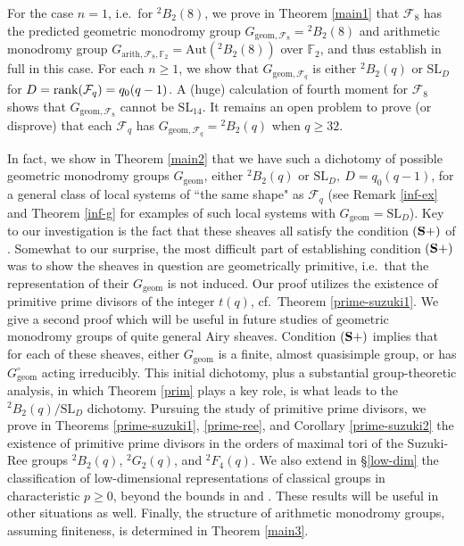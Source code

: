 \documentclass[11pt]{amsart}
\theoremstyle{plain}
\theoremstyle{definition}
\numberwithin{thm}{section}
\numberwithin{equation}{thm}
\newcommand{\rank}{{\rm rank}}
\newcommand{\Aut}{\mathrm{Aut}}
\newcommand{\SL}{\mathrm{SL}}
\newcommand{\sF}{{\mathcal F}}
\newcommand{\F}{{\mathbb F}}
\newcommand{\0}{\emptyset}
\newcommand{\ari}{{\mathrm {arith}}}
\newcommand{\geo}{{\mathrm {geom}}}
\newcommand{\CSP}{\mathrm {({\bf S+})}}
\newcommand{\tw}[1]{{}^#1\!}
\begin{document}
For the case $n=1$, i.e.\ for $\tw2 B_2(8)$, we prove in Theorem \ref{main1} that $\sF_8$ has the predicted geometric monodromy group 
$G_{\geo,\sF_8}=\tw2 B_2(8)$ and arithmetic monodromy group $G_{\ari,\sF_8,\F_2} = \Aut(\tw2 B_2(8))$ over 
$\F_2$, and thus establish \cite[Conjecture 2.2]{Ka-ERS} in full in this case. For each $n \ge 1$, we show that 
$G_{\geo,\sF_q}$ is either $\tw2 B_2(q)$ or $\SL_D$ for $D=\rank(\sF_q)=q_0(q-1)$. A (huge) calculation of fourth moment for $\sF_8$ 
shows that $G_{\geo,\sF_8}$ cannot be $\SL_{14}$. It remains an open problem to prove (or disprove) that each $\sF_q$ has  $G_{\geo,\sF_q}=\tw2 B_2(q)$ when $q \geq 32$.

In fact, we show in Theorem \ref{main2} that we have such a dichotomy of possible geometric monodromy groups $G_\geo$, either $\tw2 B_2(q)$ or $\SL_D,\ D=q_0(q-1)$, for  a general class of local systems of ``the same shape" as $\sF_q$ (see 
Remark \ref{inf-ex} and Theorem \ref{inf-g} for examples of such local systems with $G_\geo=\SL_D$).
Key to our investigation is the fact that these sheaves all satisfy the condition $\CSP$ of  \cite[Definition 1.2]{KT5}. Somewhat to our surprise, the most difficult part of establishing condition $\CSP$ was to show the sheaves in question are geometrically primitive, i.e.\ that the representation of their $G_{\geo}$ is not induced. 
Our proof utilizes the existence of primitive prime divisors of the integer $t(q)$, cf.\ Theorem \ref{prime-suzuki1}. We give a second proof which will be useful in future studies of geometric monodromy groups of quite general Airy sheaves.
Condition $\CSP$ implies that for each of these sheaves, either $G_{\geo}$ is a finite, almost quasisimple group, or
has $G_{\geo}^\circ$ acting irreducibly. This initial dichotomy, plus a substantial group-theoretic analysis, in which Theorem \ref{prim} plays a key role, is what leads to the  
$\tw2 B_2(q)/\SL_D$ dichotomy. Pursuing the study of primitive prime divisors, we prove in Theorems \ref{prime-suzuki1}, \ref{prime-ree}, and 
Corollary \ref{prime-suzuki2} the existence of primitive prime divisors in the orders of maximal tori of the Suzuki-Ree groups 
$\tw2 B_2(q)$, $\tw2 G_2(q)$, and $\tw2 F_4(q)$. We also extend in \S\ref{low-dim} the classification of low-dimensional representations 
of classical groups in characteristic $p \geq 0$, beyond the bounds in \cite{KlL} and \cite{Lu}. These results will be useful in other situations as well. Finally, the structure of arithmetic monodromy groups, assuming finiteness, is determined in Theorem \ref{main3}.
\end{document}
